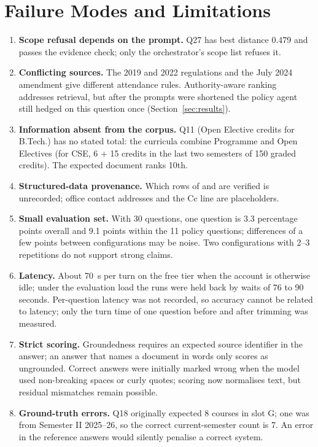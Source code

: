 \documentclass[10pt,a4paper]{article}
\newcommand{\code}[1]{\texttt{\detokenize{#1}}}
\begin{document}
\section{Failure Modes and Limitations}\label{sec:limits}
\begin{enumerate}
  \item \textbf{Scope refusal depends on the prompt.} Q27 has best distance 0.479 and passes the evidence check; only the orchestrator's scope list refuses it.
  \item \textbf{Conflicting sources.} The 2019 and 2022 regulations and the July 2024 amendment give different attendance rules. Authority-aware ranking addresses retrieval, but after the prompts were shortened the policy agent still hedged on this question once (Section~\ref{sec:results}).
  \item \textbf{Information absent from the corpus.} Q11 (Open Elective credits for B.Tech.) has no stated total: the curricula combine Programme and Open Electives (for CSE, 6 + 15 credits in the last two semesters of 150 graded credits). The expected document ranks 10th.
  \item \textbf{Structured-data provenance.} Which rows of \code{courses.csv} and \code{faculty.csv} are verified is unrecorded; office contact addresses and the Cc line are placeholders.
  \item \textbf{Small evaluation set.} With 30 questions, one question is 3.3 percentage points overall and 9.1 points within the 11 policy questions; differences of a few points between configurations may be noise. Two configurations with 2--3 repetitions do not support strong claims.
  \item \textbf{Latency.} About 70~s per turn on the free tier when the account is otherwise idle; under the evaluation load the runs were held back by waits of 76 to 90 seconds. Per-question latency was not recorded, so accuracy cannot be related to latency; only the turn time of one question before and after trimming was measured.
  \item \textbf{Strict scoring.} Groundedness requires an expected source identifier in the answer; an answer that names a document in words only scores as ungrounded. Correct answers were initially marked wrong when the model used non-breaking spaces or curly quotes; scoring now normalises text, but residual mismatches remain possible.
  \item \textbf{Ground-truth errors.} Q18 originally expected 8 courses in slot G; one was from Semester II 2025--26, so the correct current-semester count is 7. An error in the reference answers would silently penalise a correct system.

\end{enumerate}
\end{document}
